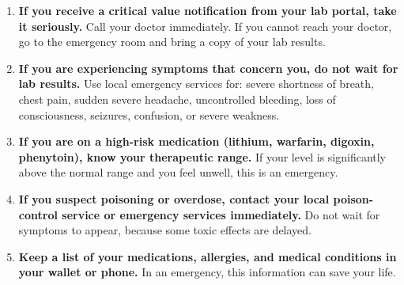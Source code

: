 \begin{enumerate}
    \item \textbf{If you receive a critical value notification from your lab portal, take it seriously.} Call your doctor immediately. If you cannot reach your doctor, go to the emergency room and bring a copy of your lab results.

    \item \textbf{If you are experiencing symptoms that concern you, do not wait for lab results.} Use local emergency services for: severe shortness of breath, chest pain, sudden severe headache, uncontrolled bleeding, loss of consciousness, seizures, confusion, or severe weakness.

    \item \textbf{If you are on a high-risk medication (lithium, warfarin, digoxin, phenytoin), know your therapeutic range.} If your level is significantly above the normal range and you feel unwell, this is an emergency.

    \item \textbf{If you suspect poisoning or overdose, contact your local poison-control service or emergency services immediately.} Do not wait for symptoms to appear, because some toxic effects are delayed.

    \item \textbf{Keep a list of your medications, allergies, and medical conditions in your wallet or phone.} In an emergency, this information can save your life.
\end{enumerate}

